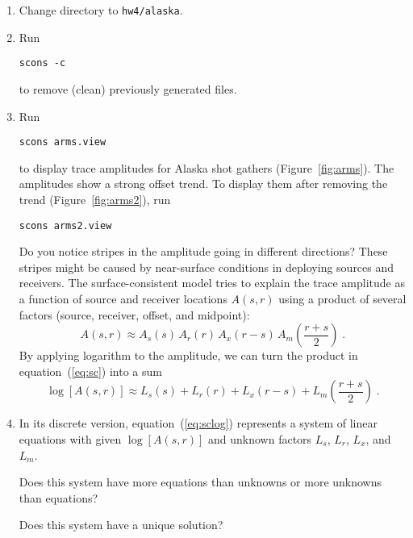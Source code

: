 \begin{enumerate}

\item Change directory to \texttt{hw4/alaska}.
\item Run
\begin{verbatim}
scons -c
\end{verbatim}
to remove (clean) previously generated files.
\item Run
\begin{verbatim}
scons arms.view
\end{verbatim}
to display trace amplitudes for Alaska shot gathers (Figure~\ref{fig:arms}). The amplitudes show a strong offset trend. To display them after removing the trend (Figure~\ref{fig:arms2}), run
\begin{verbatim}
scons arms2.view
\end{verbatim}


Do you notice stripes in the amplitude going in different directions?
These stripes might be caused by near-surface conditions in deploying
sources and receivers. The surface-consistent model \cite[]{GEO46-01-00170022} tries to explain
the trace amplitude as a function of source and receiver locations
$A(s,r)$ using a product of several factors (source, receiver, offset, and
midpoint):
\begin{equation}
\label{eq:sc}
A(s,r) \approx A_s(s)\,A_r(r)\,A_x(r-s)\,A_m\left(\frac{r+s}{2}\right)\;.
\end{equation}
By applying logarithm to the amplitude, we can turn the product in equation~(\ref{eq:sc}) into a sum
\begin{equation}
\label{eq:sclog}
\log\left[A(s,r)\right] \approx L_s(s) + L_r(r) + L_x(r-s) + L_m\left(\frac{r+s}{2}\right)\;.
\end{equation}
\item In its discrete version, equation~(\ref{eq:sclog}) represents a system of linear equations with given $\log\left[A(s,r)\right]$ and unknown factors $L_s$, $L_r$, $L_x$, and $L_m$.

Does this system have more equations than unknowns or more unknowns than equations?

\answer{%
}

Does this system have a unique solution?

\answer{%
}


\end{enumerate}
